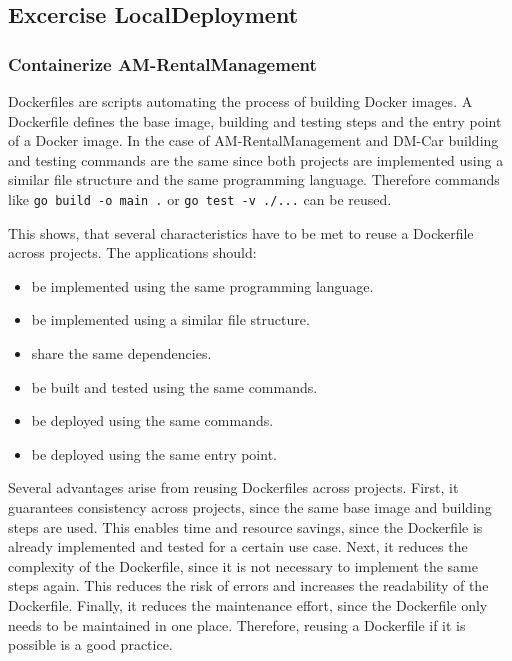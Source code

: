 \subsection{Excercise LocalDeployment}
\subsubsection*{Containerize AM-RentalManagement}
Dockerfiles are scripts automating the process of building Docker images.
A Dockerfile defines the base image, building and testing steps and the entry point of a Docker image.
In the case of AM-RentalManagement and DM-Car building and testing commands are the same since both projects are implemented using a similar file structure and the same programming language.
Therefore commands like \texttt{go build -o main .} or \texttt{go test -v ./...} can be reused.

This shows, that several characteristics have to be met to reuse a Dockerfile across projects.
The applications should:
\begin{itemize}
    \item be implemented using the same programming language.
    \item be implemented using a similar file structure.
    \item share the same dependencies.
    \item be built and tested using the same commands.
    \item be deployed using the same commands.
    \item be deployed using the same entry point.
\end{itemize}

Several advantages arise from reusing Dockerfiles across projects.
First, it guarantees consistency across projects, since the same base image and building steps are used.
This enables time and resource savings, since the Dockerfile is already implemented and tested for a certain use case.
Next, it reduces the complexity of the Dockerfile, since it is not necessary to implement the same steps again.
This reduces the risk of errors and increases the readability of the Dockerfile.
Finally, it reduces the maintenance effort, since the Dockerfile only needs to be maintained in one place.
Therefore, reusing a Dockerfile if it is possible is a good practice.

